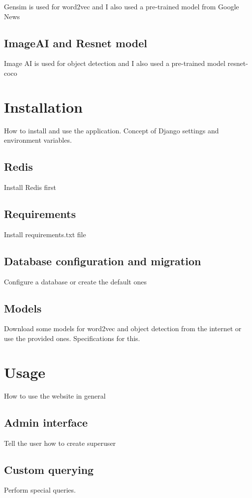 Gensim is used for word2vec and I also used a pre-trained model from Google News

\subsection{ImageAI and Resnet model}
\label{subsec:app_technology_imageai}

Image AI is used for object detection and I also used a pre-trained model resnet-coco

\section{Installation}
\label{sec:app_install}

How to install and use the application. Concept of Django settings and environment variables.

\subsection{Redis}
\label{subsec:app_install_redis}

Install Redis first

\subsection{Requirements}
\label{subsec:app_install_requirements}

Install requirements.txt file

\subsection{Database configuration and migration}
\label{subsec:app_install_database}

Configure a database or create the default ones

\subsection{Models}
\label{subsection:app_install_models}

Download some models for word2vec and object detection from the internet or use the provided ones. Specifications for this.

\section{Usage}
\label{section:app_usage}

How to use the website in general

\subsection{Admin interface}
\label{section:app_usage_admin}

Tell the user how to create superuser

\subsection{Custom querying}
\label{section:app_usage_querying}

Perform special queries.




